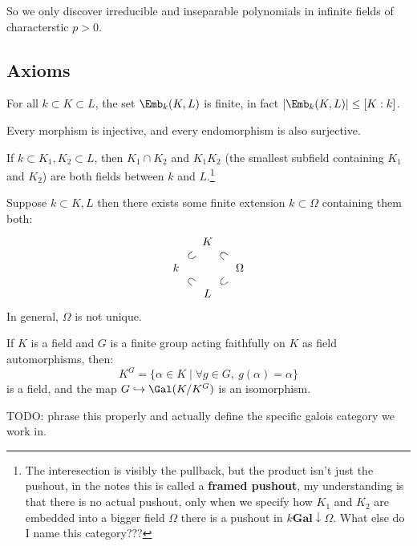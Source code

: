 \documentclass{article}
\begin{document}
So we only discover irreducible and inseparable polynomials in infinite fields of characterstic $p>0$.

\subsection{Axioms}

\begin{proposition}[A1]
    For all $k\subset K \subset L$, the set $\Emb_k(K,L)$ is finite, in fact $\abs{\Emb_k(K,L)}\leq [K : k]$.
\end{proposition}

\begin{proposition}[A2]
    Every morphism is injective, and every endomorphism is also surjective.
\end{proposition}

\begin{proposition}[A3]
    If $k\subset K_1,K_2\subset L$, then $K_1\cap K_2$ and $K_1K_2$ (the smallest subfield containing $K_1$ and $K_2$) are both fields between $k$ and $L$.\footnote{The interesection is visibly the pullback, but the product isn't just the pushout, in the notes this is called a \textbf{framed pushout}, my understanding is that there is no actual pushout, only when we specify how $K_1$ and $K_2$ are embedded into a bigger field $\Omega$ there is a pushout in $k\textbf{Gal}\downarrow\Omega$. What else do I name this category???}
\end{proposition}

\begin{proposition}
    Suppose $k\subset K,L$ then there exists some finite extension $k\subset\Omega$ containing them both: \[
    \begin{tikzcd}[row sep = small, column sep = small]
        & K \arrow[dr, phantom, sloped, "\subset"]\\
        k \arrow[ur, phantom, sloped, "\subset"] \arrow[dr, phantom, sloped, "\subset"] && \Omega\\
        & L \arrow[ur, phantom, sloped, "\subset"]
    \end{tikzcd}
    \] In general, $\Omega$ is not unique.
\end{proposition}

\begin{proposition}[A5]
    If $K$ is a field and $G$ is a finite group acting faithfully on $K$ as field automorphisms, then: \[
    K^G = \{\alpha\in K \mid \forall g\in G, \ g(\alpha) = \alpha \}
    \] is a field, and the map $G\hookrightarrow \Gal(K/K^G)$ is an isomorphism.
\end{proposition}

TODO: phrase this properly and actually define the specific galois category we work in.
\end{document}

